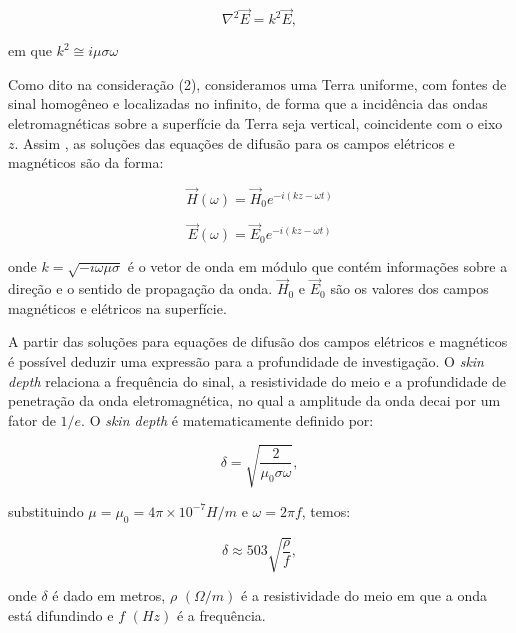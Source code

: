 \begin{equation}
\nabla^{2}\vec{E} = k^{2}\vec{E},
\label{eq_onda_freq2}
\end{equation}

em que $k^{2}\cong i\mu \sigma\omega$

Como dito na consideração (2), consideramos uma Terra uniforme, com fontes de sinal homogêneo e localizadas no infinito, de forma que a incidência das
ondas eletromagnéticas sobre a superfície da Terra seja vertical, coincidente com o eixo $z$. Assim , as soluções das equações de difusão para os campos elétricos e magnéticos são da forma:

\begin{equation}
\vec{H}(\omega) = \vec{H}_{0} e^{-i(kz-\omega t)}
\label{eq_sol1}
\end{equation}

\begin{equation}
\vec{E}(\omega) = \vec{E}_{0} e^{-i(kz-\omega t)}
\label{eq_sol2}
\end{equation}


onde $k=\sqrt{-i\omega\mu\sigma}$ é o vetor de onda em módulo que contém informações sobre a direção e o sentido de propagação da onda. $\vec{H}_{0}$ e $\vec{E}_{0}$ são os valores dos campos magnéticos e elétricos na superfície.  


A partir das soluções para equações de difusão dos campos elétricos e magnéticos é possível deduzir uma expressão para a profundidade de investigação. O \textit{skin depth} relaciona a frequência do sinal, a resistividade do meio e a profundidade de penetração da onda eletromagnética, no qual a amplitude da onda decai por um fator de $1/e$. O \textit{skin depth} é matematicamente definido por:

\begin{equation}
	\delta = \sqrt{\frac{2}{\mu_{0}\sigma\omega}},
	\label{skin}
\end{equation}

substituindo $\mu=\mu_{0}=4\pi \times 10^{-7} H/m$ e $\omega=2\pi f$, temos:

\begin{equation}
\delta \approx 503 \sqrt{\frac{\rho}{f}},
\label{skin2}
\end{equation}

onde $\delta$ é dado em metros, $\rho$ $(\Omega/m)$ é a resistividade do meio em que a onda está difundindo e $f$ $(Hz)$ é a frequência. 


